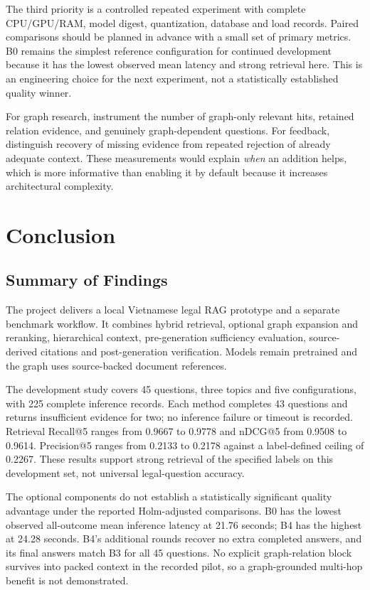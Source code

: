 \documentclass[11pt,a4paper,oneside]{report}
\begin{document}
The third priority is a controlled repeated experiment with complete CPU/GPU/RAM, model digest, quantization, database and load records. Paired comparisons should be planned in advance with a small set of primary metrics. B0 remains the simplest reference configuration for continued development because it has the lowest observed mean latency and strong retrieval here. This is an engineering choice for the next experiment, not a statistically established quality winner.

For graph research, instrument the number of graph-only relevant hits, retained relation evidence, and genuinely graph-dependent questions. For feedback, distinguish recovery of missing evidence from repeated rejection of already adequate context. These measurements would explain \emph{when} an addition helps, which is more informative than enabling it by default because it increases architectural complexity.

\chapter{Conclusion}\label{ch:conclusion}
\section{Summary of Findings}
The project delivers a local Vietnamese legal RAG prototype and a separate benchmark workflow. It combines hybrid retrieval, optional graph expansion and reranking, hierarchical context, pre-generation sufficiency evaluation, source-derived citations and post-generation verification. Models remain pretrained and the graph uses source-backed document references.

The development study covers 45 questions, three topics and five configurations, with 225 complete inference records. Each method completes 43 questions and returns insufficient evidence for two; no inference failure or timeout is recorded. Retrieval Recall@5 ranges from 0.9667 to 0.9778 and nDCG@5 from 0.9508 to 0.9614. Precision@5 ranges from 0.2133 to 0.2178 against a label-defined ceiling of 0.2267. These results support strong retrieval of the specified labels on this development set, not universal legal-question accuracy.

The optional components do not establish a statistically significant quality advantage under the reported Holm-adjusted comparisons. B0 has the lowest observed all-outcome mean inference latency at 21.76 seconds; B4 has the highest at 24.28 seconds. B4's additional rounds recover no extra completed answers, and its final answers match B3 for all 45 questions. No explicit graph-relation block survives into packed context in the recorded pilot, so a graph-grounded multi-hop benefit is not demonstrated.
\end{document}
